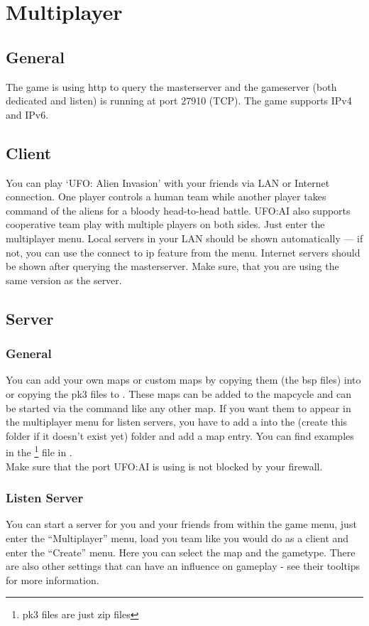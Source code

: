 \section{Multiplayer}
\subsection{General}
The game is using http to query the masterserver and the gameserver (both dedicated and listen) is running at port 27910 (TCP). The game supports IPv4 and IPv6.

\subsection{Client}
You can play `UFO: Alien Invasion' with your friends via LAN or Internet connection. One player controls a human team while another player takes command of the aliens for a bloody head-to-head battle. UFO:AI also supports cooperative team play with multiple players on both sides. Just enter the multiplayer menu. Local servers in your LAN should be shown automatically --- if not, you can use the connect to ip feature from the menu. Internet servers should be shown after querying the masterserver. Make sure, that you are using the same version as the server.

\subsection{Server}
\subsubsection{General}
You can add your own maps or custom maps by copying them (the bsp files) into  or copying the pk3 files to . These maps can be added to the mapcycle and can be started via the  command like any other map. If you want them to appear in the multiplayer menu for listen servers, you have to add a  into the  (create this folder if it doesn't exist yet) folder and add a map entry. You can find examples in the \footnote{pk3 files are just zip files} file in .\\
Make sure that the port UFO:AI is using is not blocked by your firewall.

\subsubsection{Listen Server}
You can start a server for you and your friends from within the game menu, just enter the ``Multiplayer'' menu, load you team like you would do as a client and enter the ``Create'' menu. Here you can select the map and the gametype. There are also other settings that can have an influence on gameplay - see their tooltips for more information.

